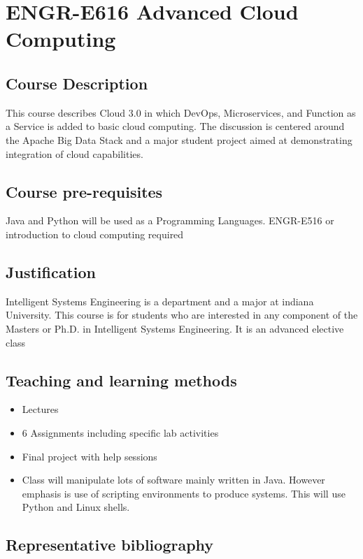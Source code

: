 
\FILENAME

\section{ENGR-E616 Advanced Cloud Computing}

\subsection{Course Description }

This course describes Cloud 3.0 in which DevOps, Microservices, and
Function as a Service is added to basic cloud computing. The
discussion is centered around the Apache Big Data Stack and a major
student project aimed at demonstrating integration of cloud
capabilities.

\subsection{Course pre-requisites}

Java and Python will be used as a Programming Languages. ENGR-E516 or
introduction to cloud computing required

\subsection{Justification}

Intelligent Systems Engineering is a department and a major at indiana
University. This course is for students who are interested in any
component of the Masters or Ph.D. in Intelligent Systems Engineering.
It is an advanced elective class


\subsection{Teaching and learning methods}

\begin{itemize}
\item	Lectures
\item	6 Assignments including specific lab activities
\item	Final project with help sessions
\item	Class will manipulate lots of software mainly written in Java. However emphasis is use of scripting environments to produce systems. This will use Python and Linux shells.
\end{itemize}

\subsection{Representative bibliography}

